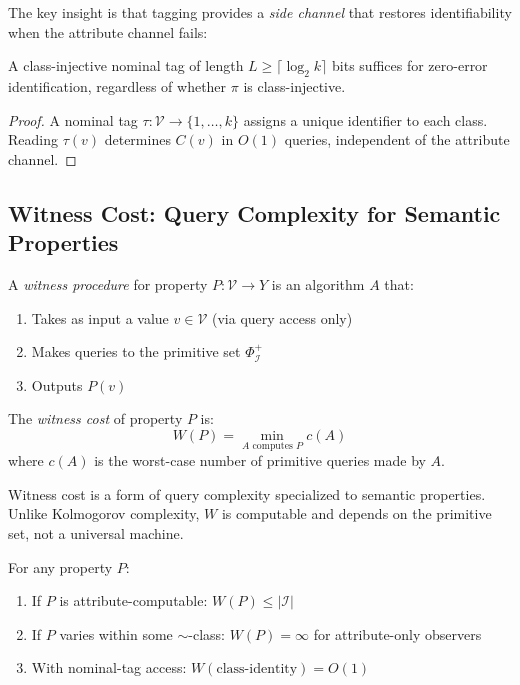 The key insight is that tagging provides a \emph{side channel} that restores identifiability when the attribute channel fails:

\begin{theorem}\label{thm:tag-restored}
A class-injective nominal tag of length $L \geq \lceil \log_2 k \rceil$ bits suffices for zero-error identification, regardless of whether $\pi$ is class-injective.
\end{theorem}

\begin{proof}
A nominal tag $\tau: \mathcal{V} \to \{1, \ldots, k\}$ assigns a unique identifier to each class. Reading $\tau(v)$ determines $C(v)$ in $O(1)$ queries, independent of the attribute channel.
\end{proof}

\subsection{Witness Cost: Query Complexity for Semantic Properties}

\begin{definition}
A \emph{witness procedure} for property $P: \mathcal{V} \to Y$ is an algorithm $A$ that:
\begin{enumerate}
\item Takes as input a value $v \in \mathcal{V}$ (via query access only)
\item Makes queries to the primitive set $\Phi_{\mathcal{I}}^+$
\item Outputs $P(v)$
\end{enumerate}
\end{definition}

\begin{definition}
The \emph{witness cost} of property $P$ is:
\[
W(P) = \min_{A \text{ computes } P} c(A)
\]
where $c(A)$ is the worst-case number of primitive queries made by $A$.
\end{definition}

\begin{remark}
Witness cost is a form of query complexity \cite{buhrman2002complexity} specialized to semantic properties. Unlike Kolmogorov complexity, $W$ is computable and depends on the primitive set, not a universal machine.
\end{remark}

\begin{lemma}\label{lem:witness-cost-lower-bounds}
For any property $P$:
\begin{enumerate}
\item If $P$ is attribute-computable: $W(P) \leq |\mathcal{I}|$
\item If $P$ varies within some $\sim$-class: $W(P) = \infty$ for attribute-only observers
\item With nominal-tag access: $W(\text{class-identity}) = O(1)$
\end{enumerate}
\end{lemma}

